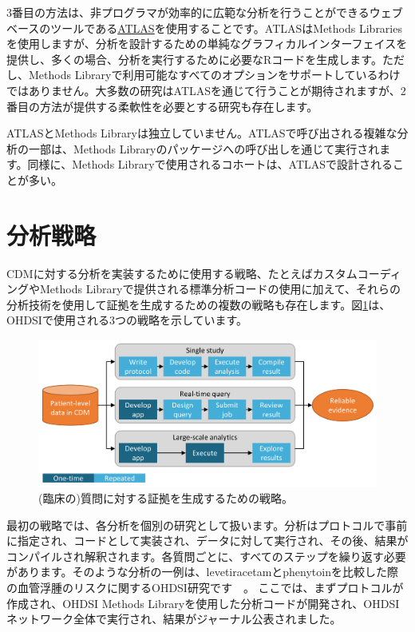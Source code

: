 \documentclass[
  11pt]{book}
\theoremstyle{definition}
\theoremstyle{definition}
\theoremstyle{definition}
\theoremstyle{definition}
\theoremstyle{remark}
\begin{document}
3番目の方法は、非プログラマが効率的に広範な分析を行うことができるウェブベースのツールである\href{https://github.com/OHDSI/Atlas/wiki}{ATLAS}を使用することです。ATLASはMethods Librariesを使用しますが、分析を設計するための単純なグラフィカルインターフェイスを提供し、多くの場合、分析を実行するために必要なRコードを生成します。ただし、Methods Libraryで利用可能なすべてのオプションをサポートしているわけではありません。大多数の研究はATLASを通じて行うことが期待されますが、2番目の方法が提供する柔軟性を必要とする研究も存在します。

ATLASとMethods Libraryは独立していません。ATLASで呼び出される複雑な分析の一部は、Methods Libraryのパッケージへの呼び出しを通じて実行されます。同様に、Methods Libraryで使用されるコホートは、ATLASで設計されることが多い。

\section{分析戦略}\label{ux5206ux6790ux6226ux7565}

CDMに対する分析を実装するために使用する戦略、たとえばカスタムコーディングやMethods Libraryで提供される標準分析コードの使用に加えて、それらの分析技術を使用して証拠を生成するための複数の戦略も存在します。図\ref{fig:strategies}は、OHDSIで使用される3つの戦略を示しています。

\begin{figure}

{\centering \includegraphics[width=0.9\linewidth]{images/OhdsiAnalyticsTools/strategies} 

}

\caption{(臨床の)質問に対する証拠を生成するための戦略。}\label{fig:strategies}
\end{figure}

最初の戦略では、各分析を個別の研究として扱います。分析はプロトコルで事前に指定され、コードとして実装され、データに対して実行され、その後、結果がコンパイルされ解釈されます。各質問ごとに、すべてのステップを繰り返す必要があります。そのような分析の一例は、levetiracetamとphenytoinを比較した際の血管浮腫のリスクに関するOHDSI研究です　\citep[ ]{duke_2017}。 ここでは、まずプロトコルが作成され、OHDSI Methods Libraryを使用した分析コードが開発され、OHDSIネットワーク全体で実行され、結果がジャーナル公表されました。
\end{document}
